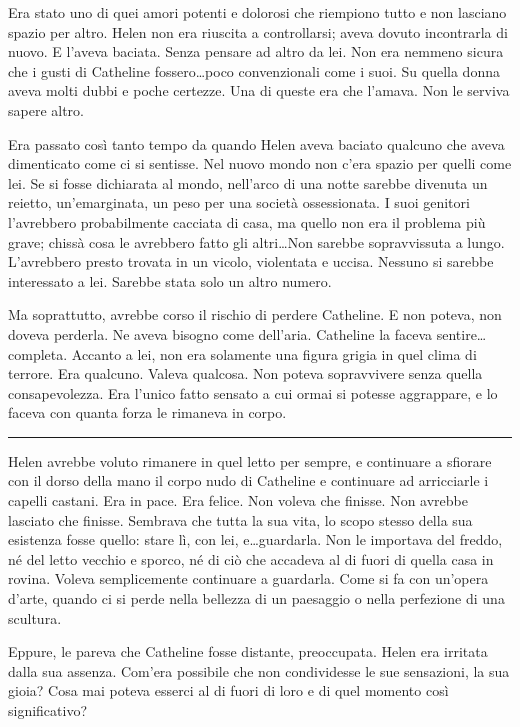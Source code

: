 \documentclass[a4paper,oneside,11pt]{memoir}
\begin{document}
Era stato uno di quei amori potenti e dolorosi che riempiono tutto e non lasciano spazio per altro.
Helen non era riuscita a controllarsi; aveva dovuto incontrarla di nuovo. E l'aveva baciata. Senza
pensare ad altro da lei. Non era nemmeno sicura che i gusti di Catheline fossero\dots poco
convenzionali come i suoi. Su quella donna aveva molti dubbi e poche certezze. Una di queste era che
l'amava. Non le serviva sapere altro.

Era passato così tanto tempo da quando Helen aveva baciato qualcuno che aveva dimenticato come ci si
sentisse. Nel nuovo mondo non c'era spazio per quelli come lei. Se si fosse dichiarata al mondo,
nell'arco di una notte sarebbe divenuta un reietto, un'emarginata, un peso per una società
ossessionata. I suoi genitori l'avrebbero probabilmente cacciata di casa, ma quello non era il
problema più grave; chissà cosa le avrebbero fatto gli altri\dots Non sarebbe sopravvissuta a lungo.
L'avrebbero presto trovata in un vicolo, violentata e uccisa. Nessuno si sarebbe interessato a lei.
Sarebbe stata solo un altro numero.

Ma soprattutto, avrebbe corso il rischio di perdere Catheline. E non poteva, non doveva perderla. Ne
aveva bisogno come dell'aria. Catheline la faceva sentire\dots completa. Accanto a lei, non era
solamente una figura grigia in quel clima di terrore. Era qualcuno. Valeva qualcosa. Non poteva
sopravvivere senza quella consapevolezza. Era l'unico fatto sensato a cui ormai si potesse
aggrappare, e lo faceva con quanta forza le rimaneva in corpo.

\plainbreak{1}

Helen avrebbe voluto rimanere in quel letto per sempre, e continuare a sfiorare con il dorso della
mano il corpo nudo di Catheline e continuare ad arricciarle i capelli castani. Era in pace. Era
felice. Non voleva che finisse. Non avrebbe lasciato che finisse. Sembrava che tutta la sua vita, lo
scopo stesso della sua esistenza fosse quello: stare lì, con lei, e\dots guardarla. Non le importava
del freddo, né del letto vecchio e sporco, né di ciò che accadeva al di fuori di quella casa in
rovina. Voleva semplicemente continuare a guardarla. Come si fa con un'opera d'arte, quando ci si
perde nella bellezza di un paesaggio o nella perfezione di una scultura.

Eppure, le pareva che Catheline fosse distante, preoccupata. Helen era irritata dalla sua assenza.
Com'era possibile che non condividesse le sue sensazioni, la sua gioia? Cosa mai poteva esserci al
di fuori di loro e di quel momento così significativo?
\end{document}
